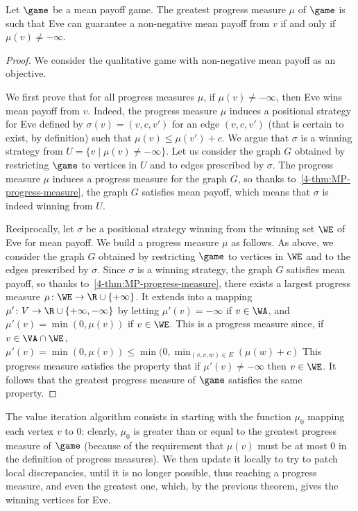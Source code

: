 \begin{theorem}\label{4-thm:greatest-progress-measure}
  Let $\game$ be a mean payoff game. The greatest progress measure $\mu$
  of $\game$ is such that Eve can guarantee a non-negative mean payoff
  from $v$ if and only if $\mu(v)\neq -\infty$.
\end{theorem}
\begin{proof}
  We consider the qualitative game with non-negative mean payoff as an
  objective.

  We first prove that for all progress measures $\mu$, if $\mu(v)\neq
  -\infty$, then Eve wins mean payoff from $v$. Indeed, the progress
  measure $\mu$ induces a positional strategy for Eve defined by
  $\sigma(v)=(v,c,v')$ for an edge $(v,c,v')$ (that is certain to
  exist, by definition) such that $\mu(v)\leq \mu(v')+c$. We argue
  that $\sigma$ is a winning strategy from $U=\{v\mid \mu(v)\neq
  -\infty\}$. Let us consider the graph $G$ obtained by restricting
  $\game$ to vertices in $U$ and to edges prescribed by $\sigma$. The
  progress measure $\mu$ induces a progress measure for the graph $G$,
  so thanks to~\cref{4-thm:MP-progress-measure}, the graph $G$
  satisfies mean payoff, which means that $\sigma$ is indeed winning
  from $U$.

  Reciprocally, let $\sigma$ be a positional strategy winning from the
  winning set $\WE$ of Eve for mean payoff. We build a progress
  measure $\mu$ as follows. As above, we consider the graph $G$
  obtained by restricting $\game$ to vertices in $\WE$ and to the
  edges prescribed by $\sigma$. Since $\sigma$ is a winning strategy,
  the graph $G$ satisfies mean payoff, so thanks
  to~\cref{4-thm:MP-progress-measure}, there exists a largest progress
  measure $\mu\colon \WE\to \R\cup\{+\infty\}$. It extends into a
  mapping $\mu'\colon V\to \R\cup\{+\infty,-\infty\}$ by letting
  $\mu'(v)=-\infty$ if $v\in\WA$, and $\mu'(v)=\min(0,\mu(v))$ if
  $v\in \WE$. This is a progress measure since, if $v\in \VA\cap\WE$,
  $\mu'(v)=\min(0,\mu(v))\leq \min(0,\min_{(v,c,w)\in
  E}(\mu(w)+c)$  This progress
  measure satisfies the property that if $\mu'(v)\neq -\infty$ then
  $v\in \WE$. It follows that the greatest progress measure of $\game$
  satisfies the same property.
\end{proof}

The value iteration algorithm consists in starting with the function
$\mu_0$ mapping each vertex $v$ to $0$: clearly, $\mu_0$ is greater
than or equal to the greatest progress measure of $\game$ (because of
the requirement that $\mu(v)$ must be at most $0$ in the definition of
progress measures). We then update it locally to try to patch local
discrepancies, until it is no longer possible, thus reaching a
progress measure, and even the greatest one, which, by the previous
theorem, gives the winning vertices for Eve.

